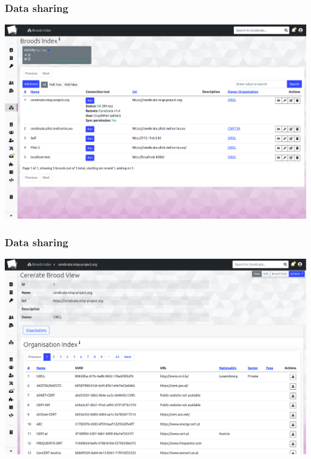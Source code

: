 \begin{frame}
\frametitle{Data sharing}
    \begin{center}
        \includegraphics[width=0.95\linewidth]{pictures/brood-index.png}
    \end{center}
\end{frame}

\begin{frame}
\frametitle{Data sharing}
    \begin{center}
        \includegraphics[width=0.95\linewidth]{pictures/brood-view.png}
    \end{center}
\end{frame}

